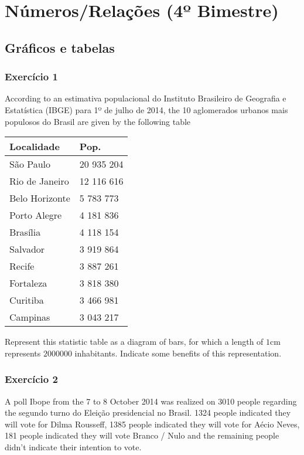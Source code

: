 \chapter{Números/Relações (4º Bimestre)}

\section{Gráficos e tabelas}

\subsection*{Exercício 1}

According to an estimativa populacional do Instituto Brasileiro de Geografia e
Estatística (IBGE) para 1º de julho de 2014, the 10 aglomerados urbanos mais
populosos do Brasil are given by the following table

\begin{center}
  \begin{tabular}{ l | l}    \hline
Localidade      & Pop.      \\ \hline
São Paulo 	&20 935 204 \\ \hline
Rio de Janeiro 	&12 116 616 \\ \hline
Belo Horizonte 	&5 783 773 \\ \hline
Porto Alegre 	&4 181 836 \\ \hline
Brasília 	&4 118 154 \\ \hline
Salvador 	&3 919 864 \\ \hline
Recife 	 	&3 887 261 \\ \hline
Fortaleza 	&3 818 380 \\ \hline
Curitiba 	&3 466 981 \\ \hline
Campinas 	&3 043 217 \\
    \hline
  \end{tabular}
\end{center}

Represent this statistic table as a diagram of bars, for which a length of
${1\text{cm}}$ represents $2000000$ inhabitants. Indicate some benefits of
this representation.

\subsection*{Exercício 2}

A poll Ibope from the 7 to 8 October 2014 was realized on 3010 people
regarding the segundo turno do Eleição presidencial no Brasil. 1324 people
indicated they will vote for Dilma Rousseff, 1385 people indicated they
will vote for Aécio Neves, 181 people indicated they will vote Branco / Nulo
and the remaining people didn't indicate their intention to vote.

